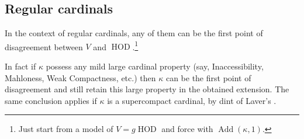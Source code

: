 \documentclass[11pt]{amsart}
\newtheorem{proposition}[theorem]{Proposition}
\theoremstyle{definition}
\theoremstyle{remark}
\DeclareMathOperator{\crit}{crit}
\DeclareMathOperator{\HOD}{HOD}
\DeclareMathOperator{\Add}{Add}
\def\s{\subseteq}
\begin{document}
\subsection{Regular cardinals}
In the context of regular cardinals, any of them can be the first point of disagreement between $V$ and $\HOD$.\footnote{Just start from a model of $V=g\HOD$ and force with $\Add(\kappa,1)$.} 

\label{Fact: critical point can be measurable}
In fact if $\kappa$ possess any mild large cardinal property (say, Inaccessibility, Mahloness, Weak Compactness, etc.) then $\kappa$ can be the first point of disagreement and still retain this large property in the obtained extension. The same conclusion applies if $\kappa$ is a   supercompact cardinal, by dint of Laver's  \cite{Lav}.   
\end{document}
